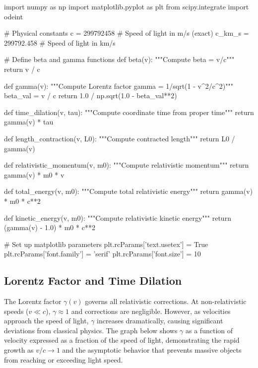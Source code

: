\documentclass[a4paper, 11pt]{article}
\begin{document}
\begin{pycode}
import numpy as np
import matplotlib.pyplot as plt
from scipy.integrate import odeint

# Physical constants
c = 299792458  # Speed of light in m/s (exact)
c_km_s = 299792.458  # Speed of light in km/s

# Define beta and gamma functions
def beta(v):
    """Compute beta = v/c"""
    return v / c

def gamma(v):
    """Compute Lorentz factor gamma = 1/sqrt(1 - v^2/c^2)"""
    beta_val = v / c
    return 1.0 / np.sqrt(1.0 - beta_val**2)

def time_dilation(v, tau):
    """Compute coordinate time from proper time"""
    return gamma(v) * tau

def length_contraction(v, L0):
    """Compute contracted length"""
    return L0 / gamma(v)

def relativistic_momentum(v, m0):
    """Compute relativistic momentum"""
    return gamma(v) * m0 * v

def total_energy(v, m0):
    """Compute total relativistic energy"""
    return gamma(v) * m0 * c**2

def kinetic_energy(v, m0):
    """Compute relativistic kinetic energy"""
    return (gamma(v) - 1.0) * m0 * c**2

# Set up matplotlib parameters
plt.rcParams['text.usetex'] = True
plt.rcParams['font.family'] = 'serif'
plt.rcParams['font.size'] = 10
\end{pycode}

\subsection{Lorentz Factor and Time Dilation}

The Lorentz factor $\gamma(v)$ governs all relativistic corrections. At non-relativistic
speeds ($v \ll c$), $\gamma \approx 1$ and corrections are negligible. However, as velocities
approach the speed of light, $\gamma$ increases dramatically, causing significant deviations
from classical physics. The graph below shows $\gamma$ as a function of velocity expressed
as a fraction of the speed of light, demonstrating the rapid growth as $v/c \to 1$ and the
asymptotic behavior that prevents massive objects from reaching or exceeding light speed.
\end{document}
